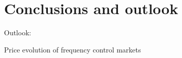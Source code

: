 \documentclass[a4paper,11pt,twoside,onecolumn]{book}
\begin{document}
\frontmatter



%


%


\tableofcontents
\newpage



\mainmatter













\chapter{Conclusions and outlook}
\label{conclusion}
%

Outlook:

Price evolution of frequency control markets 
\appendix
%




\backmatter



\end{document}
